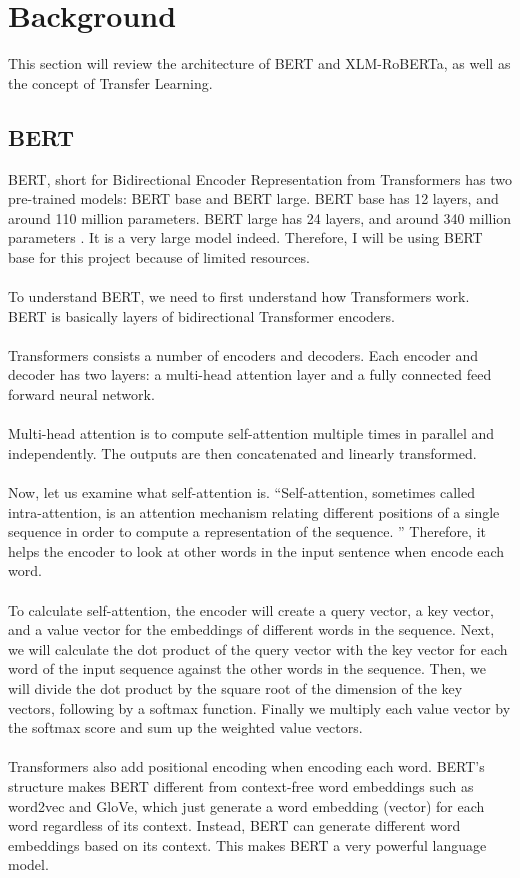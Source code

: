 \documentclass[11pt,a4paper]{article}
\begin{document}
\section{Background}

This section will review the architecture of BERT and XLM-RoBERTa, as well as the concept of Transfer Learning.

\subsection{BERT} 

BERT, short for Bidirectional Encoder Representation from Transformers has two pre-trained models: BERT base and BERT large. BERT base has 12 layers, and around 110 million parameters. BERT large has 24 layers, and around 340 million parameters \cite{BERT}. It is a very large model indeed. Therefore, I will be using BERT base for this project because of limited resources.\\
\\
To understand BERT, we need to first understand how Transformers work. BERT is basically layers of bidirectional Transformer encoders.\\
\\
Transformers consists a number of encoders and decoders. Each encoder and decoder has two layers: a multi-head attention layer and a fully connected feed forward neural network.\\
\\
Multi-head attention is to compute self-attention multiple times in parallel and independently. The outputs are then concatenated and linearly transformed.\\
\\
Now, let us examine what self-attention is. “Self-attention, sometimes called intra-attention, is an attention mechanism relating different positions of a single sequence in order to compute a representation of the sequence. \cite{attention}” Therefore, it helps the encoder to look at other words in the input sentence when encode each word.\\
\\
To calculate self-attention, the encoder will create a query vector, a key vector, and a value vector for the embeddings of different words in the sequence. Next, we will calculate the dot product of the query vector with the key vector for each word of the input sequence against the other words in the sequence. Then, we will divide the dot product by the square root of the dimension of the key vectors, following by a softmax function. Finally we multiply each value vector by the softmax score and sum up the weighted value vectors.\\
\\
Transformers also add positional encoding when encoding each word. BERT’s structure makes BERT different from context-free word embeddings such as  word2vec and GloVe, which just generate a word embedding (vector) for each word regardless of its context. Instead, BERT can generate different word embeddings based on its context. This makes BERT a very powerful language model.\\
\end{document}
